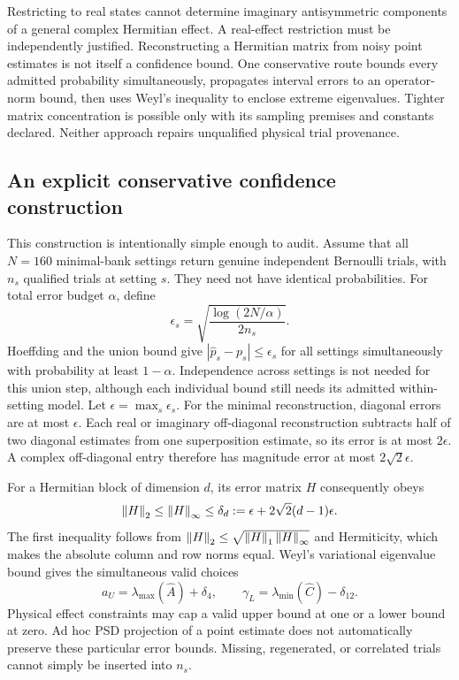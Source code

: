 \documentclass[11pt,a4paper]{article}
\begin{document}
Restricting to real states cannot determine imaginary antisymmetric components of a general complex Hermitian effect. A real-effect restriction must be independently justified. Reconstructing a Hermitian matrix from noisy point estimates is not itself a confidence bound. One conservative route bounds every admitted probability simultaneously, propagates interval errors to an operator-norm bound, then uses Weyl's inequality to enclose extreme eigenvalues. Tighter matrix concentration is possible only with its sampling premises and constants declared. Neither approach repairs unqualified physical trial provenance.


\subsection{An explicit conservative confidence construction}
This construction is intentionally simple enough to audit. Assume that all $N=160$ minimal-bank settings return genuine independent Bernoulli trials, with $n_s$ qualified trials at setting $s$. They need not have identical probabilities. For total error budget $\alpha$, define
\begin{equation}
\epsilon_s=\sqrt{\frac{\log(2N/\alpha)}{2n_s}}.
\end{equation}
Hoeffding and the union bound give $|\hat p_s-p_s|\le\epsilon_s$ for all settings simultaneously with probability at least $1-\alpha$. Independence across settings is not needed for this union step, although each individual bound still needs its admitted within-setting model. Let $\epsilon=\max_s\epsilon_s$. For the minimal reconstruction, diagonal errors are at most $\epsilon$. Each real or imaginary off-diagonal reconstruction subtracts half of two diagonal estimates from one superposition estimate, so its error is at most $2\epsilon$. A complex off-diagonal entry therefore has magnitude error at most $2\sqrt2\epsilon$.

For a Hermitian block of dimension $d$, its error matrix $H$ consequently obeys
\begin{equation}
\left\lVert H\right\rVert_2\le\left\lVert H\right\rVert_\infty
\le\delta_d:=\epsilon+2\sqrt2(d-1)\epsilon.
\end{equation}
The first inequality follows from $\left\lVert H\right\rVert_2\le\sqrt{\left\lVert H\right\rVert_1\left\lVert H\right\rVert_\infty}$ and Hermiticity, which makes the absolute column and row norms equal. Weyl's variational eigenvalue bound gives the simultaneous valid choices
\begin{equation}
a_U=\lambda_{\max}(\widehat A)+\delta_4,\qquad
\gamma_L=\lambda_{\min}(\widehat C)-\delta_{12}.
\end{equation}
Physical effect constraints may cap a valid upper bound at one or a lower bound at zero. Ad hoc PSD projection of a point estimate does not automatically preserve these particular error bounds. Missing, regenerated, or correlated trials cannot simply be inserted into $n_s$.
\end{document}
